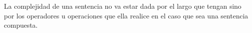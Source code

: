La complejidad de una sentencia no va estar dada por el largo que tengan sino por los operadores u operaciones que ella realice en el caso que sea una sentencia compuesta.